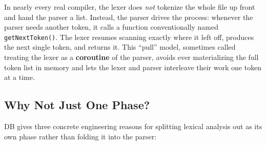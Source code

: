 \documentclass[full-course-notes.tex]{subfiles}
\begin{document}
\begin{center}
\end{center}

\begin{coreidea}
In nearly every real compiler, the lexer does \emph{not} tokenize the whole file up front and
hand the parser a list. Instead, the parser drives the process: whenever the parser needs another
token, it calls a function conventionally named \texttt{getNextToken()}. The lexer resumes
scanning exactly where it left off, produces the next single token, and returns it. This
``pull'' model, sometimes called treating the lexer as a \textbf{coroutine} of the parser, avoids
ever materializing the full token list in memory and lets the lexer and parser interleave their
work one token at a time.
\end{coreidea}

\subsection{Why Not Just One Phase?}
\label{sec:l3-why-separate}

\dbtag DB gives three concrete engineering reasons for splitting lexical analysis out as its own
phase rather than folding it into the parser:
\end{document}
